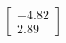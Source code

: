 \documentclass[preview]{standalone}
\begin{document}
\begin{align*}
\begin{bmatrix} -4.82 \\ 2.89 \end{bmatrix}
\end{align*}
\end{document}
